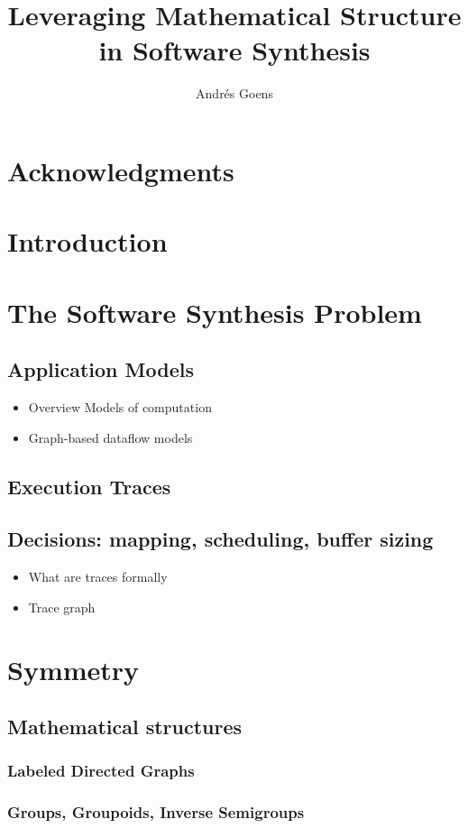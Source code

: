 \documentclass{article}
\title{Leveraging Mathematical Structure in Software Synthesis}
\author{Andr\'{e}s Goens}
\begin{document}
\date{}

\maketitle
\tableofcontents
\clearpage
\section*{Acknowledgments}

\section{Introduction}

\section{The Software Synthesis Problem}
\subsection{Application Models}
\begin{itemize}
\item Overview Models of computation
\item Graph-based dataflow models
\end{itemize}
\subsection{Execution Traces}
\subsection{Decisions: mapping, scheduling, buffer sizing}
\begin{itemize}
\item What are traces formally
\item Trace graph
\end{itemize}
\section{Symmetry}
\subsection{Mathematical structures}
\subsubsection{Labeled Directed Graphs}
\subsubsection{Groups, Groupoids, Inverse Semigroups}
\end{document}
